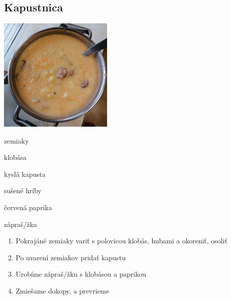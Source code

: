 \setcounter{step}{0}
\subsection{Kapustnica}

\begin{ingredient}
\includegraphics[height=5.5cm]{images/kapustnica}
\def\portions{4}%

\begin{main}
	\item zemiaky
	\item klobása
	\item kyslá kapusta
	\item sušené hríby
	\item červená paprika
	\item zápraš/žka
\end{main}
\end{ingredient}
\begin{recipe}

\begin{enumerate}

\item{Pokrajáné zemiaky variť s polovicou klobás, hubami a okoreniť, osoliť}
\item{Po uvarení zemiakov pridať kapustu}
\item{Urobíme zápraš/žku s klobásou a paprikou}
\item{Zmiešame dokopy, a prevrieme}

\end{enumerate}
\end{recipe}

\begin{notes}

\end{notes}
\clearpage	
